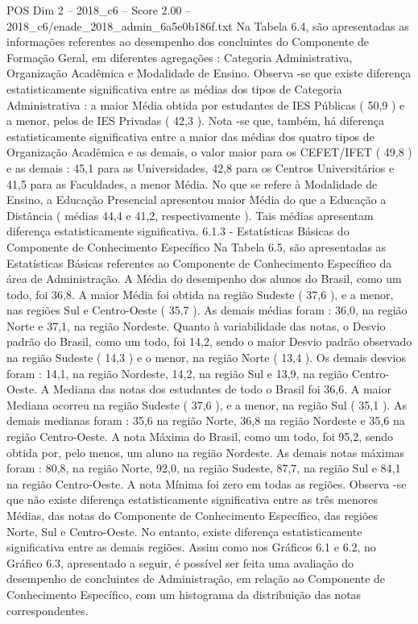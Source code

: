 \begin{textsample}{POS Dim 2 – 2018\_c6 – Score 2.00 – 2018\_c6/enade\_2018\_admin\_6a5e0b186f.txt}
Na Tabela 6.4, são apresentadas as informações referentes ao desempenho dos concluintes do Componente de Formação Geral, em diferentes agregações : Categoria Administrativa, Organização Acadêmica e Modalidade de Ensino.
Observa -se que existe diferença estatisticamente significativa entre as médias dos tipos de Categoria Administrativa : a maior Média obtida por estudantes de IES Públicas ( 50,9 ) e a menor, pelos de IES Privadas ( 42,3 ).
Nota -se que, também, há diferença estatisticamente significativa entre a maior das médias dos quatro tipos de Organização Acadêmica e as demais, o valor maior para os CEFET/IFET ( 49,8 ) e as demais : 45,1 para as Universidades, 42,8 para os Centros Universitários e 41,5 para as Faculdades, a menor Média.
No que se refere à Modalidade de Ensino, a Educação Presencial apresentou maior Média do que a Educação a Distância ( médias 44,4 e 41,2, respectivamente ).
Tais médias apresentam diferença estatisticamente significativa. 6.1.3 - Estatísticas Básicas do Componente de Conhecimento Específico Na Tabela 6.5, são apresentadas as Estatísticas Básicas referentes ao Componente de Conhecimento Específico da área de Administração.
A Média do desempenho dos alunos do Brasil, como um todo, foi 36,8.
A maior Média foi obtida na região Sudeste ( 37,6 ), e a menor, nas regiões Sul e Centro-Oeste ( 35,7 ).
As demais médias foram : 36,0, na região Norte e 37,1, na região Nordeste.
Quanto à variabilidade das notas, o Desvio padrão do Brasil, como um todo, foi 14,2, sendo o maior Desvio padrão observado na região Sudeste ( 14,3 ) e o menor, na região Norte ( 13,4 ).
Os demais desvios foram : 14,1, na região Nordeste, 14,2, na região Sul e 13,9, na região Centro-Oeste.
A Mediana das notas dos estudantes de todo o Brasil foi 36,6.
A maior Mediana ocorreu na região Sudeste ( 37,6 ), e a menor, na região Sul ( 35,1 ).
As demais medianas foram : 35,6 na região Norte, 36,8 na região Nordeste e 35,6 na região Centro-Oeste.
A nota Máxima do Brasil, como um todo, foi 95,2, sendo obtida por, pelo menos, um aluno na região Nordeste.
As demais notas máximas foram : 80,8, na região Norte, 92,0, na região Sudeste, 87,7, na região Sul e 84,1 na região Centro-Oeste.
A nota Mínima foi zero em todas as regiões.
Observa -se que não existe diferença estatisticamente significativa entre as três menores Médias, das notas do Componente de Conhecimento Específico, das regiões Norte, Sul e Centro-Oeste.
No entanto, existe diferença estatisticamente significativa entre as demais regiões.
Assim como nos Gráficos 6.1 e 6.2, no Gráfico 6.3, apresentado a seguir, é possível ser feita uma avaliação do desempenho de concluintes de Administração, em relação ao Componente de Conhecimento Específico, com um histograma da distribuição das notas correspondentes.

\end{textsample}
